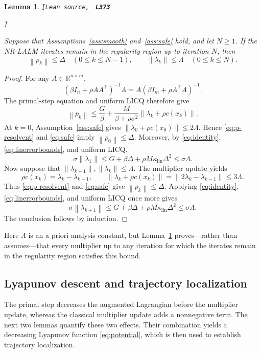 \documentclass[11pt]{article}
\newtheorem{lemma}[theorem]{Lemma}
\theoremstyle{definition}
\theoremstyle{remark}
\numberwithin{equation}{section}
\numberwithin{figure}{section}
\numberwithin{table}{section}
\numberwithin{algorithm}{section}
\newcommand{\R}{\mathbb{R}}
\newcommand{\norm}[1]{\left\lVert #1\right\rVert}
\newcommand{\leanLinkText}[1]{%
  \underline{\textbf{#1}}%
}
\newcommand{\leanDeclTag}[2]{%
  {\footnotesize\texttt{[Lean source, }}%
  \href{https://github.com/optpku/ReasBook/blob/v4.32.2/ReasBook/Papers/TR_LALM_theory/#1?plain=1\#L#2}%
    {\leanLinkText{\footnotesize\texttt{L#2}}}%
}
\newcommand{\leanDeclTagEnd}{%
  \unskip
  {\footnotesize\texttt{]}}\enspace
}
\begin{document}
\begin{lemma}
\label{lem:invariant}
\leanDeclTag{Lemma_2_6.lean}{373}
\leanDeclTagEnd
Suppose that Assumptions~\ref{ass:smooth} and~\ref{ass:safe} hold, and let $N\ge1$. If the NR-LALM iterates remain in the regularity region up to iteration $N$, then
$$
    \norm{p_k}\leq\Delta
    \quad (0\leq k\leq N-1),
    \qquad
    \norm{\lambda_k}\leq\Lambda
    \quad (0\leq k\leq N).
$$
\end{lemma}
\begin{proof}
For any $A\in\R^{n\times m}$,
$$
    (\beta I_n+\rho AA^\top)^{-1}A
    =
    A(\beta I_m+\rho A^\top A)^{-1}.
$$
The primal-step equation and uniform LICQ therefore give
\begin{equation}
    \norm{p_k}
    \leq
    \frac{G}{\beta}
    +
    \frac{M}{\beta+\rho\sigma^2}
    \norm{\lambda_k+\rho c(x_k)}.
    \label{eq:p-resolvent}
\end{equation}
At $k=0$, Assumption~\ref{ass:safe} gives $\norm{\lambda_0+\rho c(x_0)}\leq2\Lambda$.
Hence \eqref{eq:p-resolvent} and \eqref{eq:safe} imply
$\norm{p_0}\leq\Delta$.  Moreover, by
\eqref{eq:identity}, \eqref{eq:linerrorbounds}, and uniform LICQ,
$$
    \sigma\norm{\lambda_1}
    \leq
    G+\beta\Delta
    +\rho M\kappa_{\mathrm{lin}}\Delta^2
    \leq
    \sigma\Lambda.
$$
Now suppose that
$\norm{\lambda_{k-1}},\norm{\lambda_k}\leq\Lambda$. The multiplier
update yields
$$
    \rho c(x_k)=\lambda_k-\lambda_{k-1},
    \qquad
    \norm{\lambda_k+\rho c(x_k)}
    =
    \norm{2\lambda_k-\lambda_{k-1}}
    \leq3\Lambda.
$$
Thus \eqref{eq:p-resolvent} and \eqref{eq:safe} give
$\norm{p_k}\leq\Delta$. Applying
\eqref{eq:identity}, \eqref{eq:linerrorbounds}, and uniform LICQ once
more gives
$$
    \sigma\norm{\lambda_{k+1}}
    \leq
    G+\beta\Delta
    +\rho M\kappa_{\mathrm{lin}}\Delta^2
    \leq
    \sigma\Lambda.
$$
The conclusion follows by induction.
\end{proof}

Here $\Lambda$ is an a priori analysis constant, but Lemma~\ref{lem:invariant} proves---rather than assumes---that every multiplier up to any iteration for which the iterates remain in the regularity region satisfies this bound.

\subsection{Lyapunov descent and trajectory localization}

The primal step decreases the augmented Lagrangian before the multiplier update, whereas the classical multiplier update adds a nonnegative term. The next two lemmas quantify these two effects.  Their combination yields a decreasing Lyapunov function \eqref{eq:potential}, which is then used to establish trajectory localization.
\end{document}
